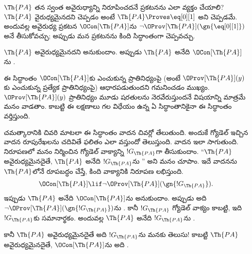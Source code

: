 \documentclass[../../../include/open-logic-section]{subfiles}
\begin{document}


$\Th{PA}$ తన స్వంత అవైరుధ్యాన్ని నిరూపించదనే ప్రకటనను ఎలా వ్యక్తం చేయాలి?
$\Th{PA}$ వైరుధ్యమైనదని చెప్పడం అంటే $\Th{PA} \Proves \eq[0][1]$ అని
చెప్పడమే. అందువల్ల అవైరుధ్య ప్రకటన $\OCon[\Th{PA}]$ను
$\lnot \OProv[\Th{PA}](\gn{\eq[0][1]})$ అనే  తీసుకోవచ్చు;
అప్పుడు మన ప్రకటనను కింది సిద్ధాంతంగా చెప్పవచ్చు.

\begin{thm}
$\Th{PA}$ అవైరుధ్యమైనదని అనుకుందాం. అప్పుడు $\Th{PA}$ అనేది
$\OCon[\Th{PA}]$ను .
\end{thm}

ఈ సిద్ధాంతం $\OCon[\Th{PA}]$కు ఎంచుకున్న ప్రాతినిధ్యంపై (అంటే
$\OProv[\Th{PA}](y)$కు ఎంచుకున్న ప్రత్యేక ప్రాతినిధ్యంపై) ఆధారపడుతుందని
గమనించడం ముఖ్యం. $\OProv[\Th{PA}](y)$ ప్రాతినిధ్యం మూడు
 షరతులను నెరవేరుస్తుందనే విషయాన్ని మాత్రమే మనం వాడతాం.
కాబట్టి ఈ లక్షణాలు గల  విధేయం ఉన్న ఏ సిద్ధాంతానికైనా ఈ
సిద్ధాంతం వర్తిస్తుంది.

చమత్కారానికి చివరి మాటలా ఈ సిద్ధాంతం వాదన చివర్లో తేలుతుంది. అందుకే గ్యోడెల్ ఇచ్చిన
వాదన రూపురేఖలను చదివితే ఫలితం ఎలా వస్తుందో తెలుస్తుంది. వాదన ఇలా సాగుతుంది.
 నిరూపణలో మనం నిర్మించిన గ్యోడెల్ వాక్యాన్ని
$!G_\Th{PA}$గా తీసుకుందాం.
``$\Th{PA}$ అవైరుధ్యమైనదైతే, $\Th{PA}$ అనేది $!G_\Th{PA}$ను
'' అని మనం చూపాం. ఇదే వాదనను $\Th{PA}$లోనే రూపబద్ధం చేస్తే, కింది వాక్యానికి నిరూపణ లభిస్తుంది.
\[
\OCon[\Th{PA}] \lif \lnot \OProv[\Th{PA}](\gn{!G_\Th{PA}}).
\]
ఇప్పుడు $\Th{PA}$ అనేది $\OCon[\Th{PA}]$ను
 అనుకుందాం. అప్పుడు అది
$\lnot \OProv[\Th{PA}](\gn{!G_\Th{PA}})$ను .
కానీ $!G_\Th{PA}$ గ్యోడెల్ వాక్యం కాబట్టి, ఇది $!G_\Th{PA}$కు సమానార్థకం.
అందువల్ల $\Th{PA}$ అనేది $!G_\Th{PA}$ను .

కానీ $\Th{PA}$ అవైరుధ్యమైనదైతే అది $!G_\Th{PA}$ను
 మనకు తెలుసు!{} కాబట్టి $\Th{PA}$ అవైరుధ్యమైనదైతే,
$\OCon[\Th{PA}]$ను అది .
\end{document}
